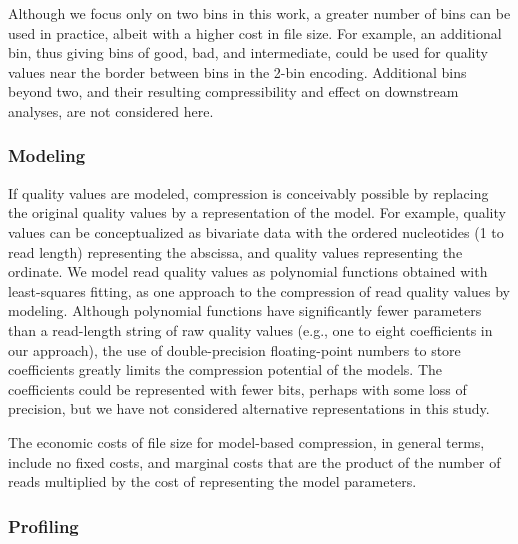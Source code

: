 \documentclass[fleqn,10pt,lineno]{wlpeerj} %
\begin{document}
Although we focus only on two bins in this work, a greater number of
bins can be used in practice, albeit with a higher cost in file size.
For example, an additional bin, thus giving bins of good, bad, and
intermediate, could be used for quality values near the border between
bins in the 2-bin encoding. Additional bins beyond two, and their
resulting compressibility and effect on downstream analyses, are not
considered here.

\subsubsection*{Modeling}

If quality values are modeled, compression is conceivably possible by
replacing the original quality values by a representation of the
model. For example, quality values can be conceptualized as bivariate
data with the ordered nucleotides (1 to read length) representing the
abscissa, and quality values representing the ordinate. We model read
quality values as polynomial functions obtained with least-squares
fitting, as one approach to the compression of read quality values by
modeling. Although polynomial functions have significantly fewer
parameters than a read-length string of raw quality values (e.g., one
to eight coefficients in our approach), the use of double-precision
floating-point numbers to store coefficients greatly limits the
compression potential of the models. The coefficients could be
represented with fewer bits, perhaps with some loss of precision, but
we have not considered alternative representations in this study.

The economic costs of file size for model-based compression, in
general terms, include no fixed costs, and marginal costs that are the
product of the number of reads multiplied by the cost of representing
the model parameters.

\subsubsection*{Profiling}
\end{document}
